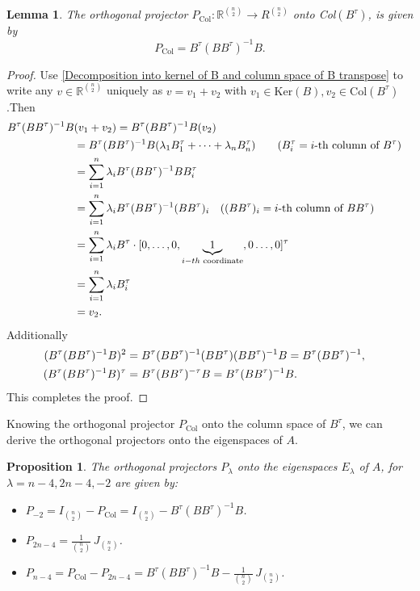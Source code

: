 \documentclass[12pt]{amsart}
\numberwithin{theorem}{section}
\newtheorem{proposition}[theorem]{Proposition}
\newtheorem{lemma}[theorem]{Lemma}
\theoremstyle{remark}
\newcommand{\kerr}{\text{Ker}}
\begin{document}
\begin{lemma}
The orthogonal projector $P_{\text{Col}}:\mathbb R^{n\choose 2} \to R^{n\choose 2}$ onto Col$(B^\tau)$, is given by 
$$P_{\text{Col}}=B^\tau (BB^\tau)^{-1}B.$$
\end{lemma}
\begin{proof} 
Use \eqref{Decomposition into kernel of B and column space of B transpose} to write any $v\in \mathbb R^{n\choose 2}$ uniquely as $v = v_1 + v_2$ with $v_1\in \kerr(B), v_2\in \text{Col}(B^\tau)$.Then   
\begin{align*}
B^\tau(BB^\tau)^{-1}B & (v_1+v_2)  = B^\tau(BB^\tau)^{-1}B (v_2) \cr 
& = B^\tau(BB^\tau)^{-1}B (\lambda_1B_1^\tau + \dots + \lambda_nB_n^\tau) \qquad (B^\tau_i = i\text{-th column of }B^\tau)\cr 
& = \sum_{i=1}^n \lambda _i B^\tau (BB^\tau)^{-1} BB_i^\tau \cr
& = \sum_{i=1}^n \lambda _i B^\tau (BB^\tau)^{-1} (BB^\tau)_i \quad ((BB^\tau)_i = i\text{-th column of }BB^\tau) \cr 
& = \sum_{i=1}^n \lambda _i B^\tau \cdot [0,\dots, 0,\underbrace{1}_{i-th \text{ coordinate}},0\dots, 0]^\tau  \cr
& = \sum_{i=1}^n \lambda _i B_i^\tau \cr 
& = v_2.
\end{align*}
Additionally
\begin{align*}
(B^\tau(BB^\tau)^{-1}B)^2& = B^\tau(BB^\tau)^{-1}(BB^\tau)(BB^\tau)^{-1}B = B^\tau(BB^\tau)^{-1}, \cr
(B^\tau(BB^\tau)^{-1}B)^\tau & = B^\tau (BB^\tau)^{-\tau} B = B^\tau(BB^\tau)^{-1}B.
\end{align*}
This completes the proof.  
\end{proof}
Knowing the orthogonal projector $P_{\text{Col}}$ onto the column space of $B^\tau$, we can derive the orthogonal projectors onto the eigenspaces of $A$. 
\begin{proposition} \label{The orthogonal projectors of the pair-cut matrix}
The orthogonal projectors $P_\lambda$ onto the eigenspaces $E_\lambda$ of $A$, for $\lambda = n-4, 2n-4, -2$ are given by:
\begin{itemize}
\item[(i)] $P_{-2} = I_{n\choose 2} - P_{\text{Col}} = I_{n\choose 2} - B^\tau(BB^\tau)^{-1}B$.
\vskip3mm
\item[(ii)] $P_{2n-4} = \frac{1}{{n\choose 2}} \, J_{n\choose 2}$.
\vskip3mm
\item[(iii)] $P_{n-4} = P_{\text{Col}} - P_{2n-4} = B^\tau(BB^\tau)^{-1}B - \frac{1}{{n\choose 2}}\,  J_{n\choose 2}$.
\end{itemize}
\end{proposition} 
\end{document}
